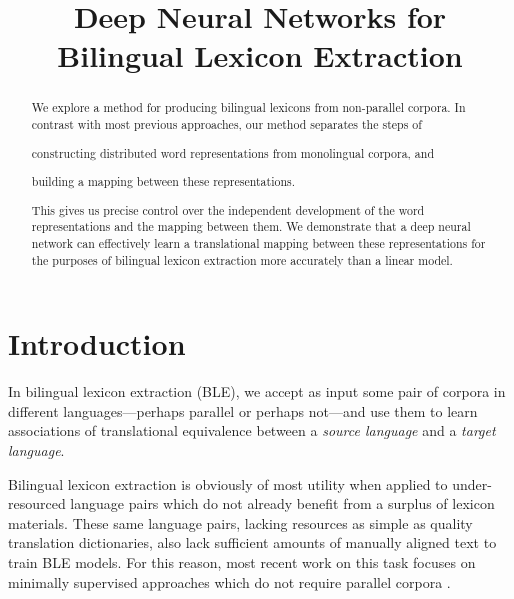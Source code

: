 \documentclass[11pt]{article}
\title{Deep Neural Networks for Bilingual Lexicon Extraction}
\date{}
\begin{document}
\maketitle

\begin{abstract}
  We explore a method for producing bilingual lexicons from non-parallel
  corpora. In contrast with most previous approaches, our method separates the steps
  of \begin{inparaenum}[(1)]
    \item constructing distributed word representations from monolingual
      corpora, and
    \item building a mapping between these representations.
  \end{inparaenum}
  This gives us precise control over the independent development of the word representations and the mapping between them.
  We demonstrate that a deep neural network can effectively learn a translational
  mapping between these representations for the purposes of bilingual lexicon extraction more accurately than a linear model.
\end{abstract}

\section{Introduction}
\label{sec:introduction}

In bilingual lexicon extraction (BLE), we accept as input some pair of corpora
in different languages---perhaps parallel or perhaps not---and use them to learn associations of translational equivalence between a \textit{source language} and a \textit{target language}.

Bilingual lexicon extraction is obviously of most utility when applied to
under-resourced language pairs which do not already benefit from a surplus of
lexicon materials. These same language pairs, lacking resources as simple as quality translation dictionaries, also lack sufficient amounts of manually aligned
text to train BLE models. %
For this reason, most recent work on this task focuses on
minimally supervised approaches which do not require parallel corpora
\cite{rapp1995,peirsman2010}.
\end{document}
